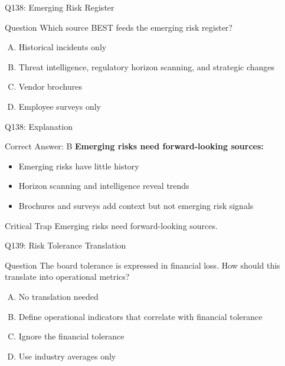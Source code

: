 \documentclass{beamer}
\begin{document}
	\begin{frame}{Q138: Emerging Risk Register}
		\begin{block}{Question}
			Which source BEST feeds the emerging risk register?
		\end{block}
		\begin{enumerate}[(A)]
			\item Historical incidents only
			\item Threat intelligence, regulatory horizon scanning, and strategic changes
			\item Vendor brochures
			\item Employee surveys only
		\end{enumerate}
	\end{frame}
	
	\begin{frame}{Q138: Explanation}
		\begin{block}{Correct Answer: B}
			\textbf{Emerging risks need forward-looking sources:}
			\begin{itemize}
				\item Emerging risks have little history
				\item Horizon scanning and intelligence reveal trends
				\item Brochures and surveys add context but not emerging risk signals
			\end{itemize}
		\end{block}
		\begin{alertblock}{Critical Trap}
			Emerging risks need forward-looking sources.
		\end{alertblock}
	\end{frame}
	
	\begin{frame}{Q139: Risk Tolerance Translation}
		\begin{block}{Question}
			The board tolerance is expressed in financial loss. How should this translate into operational metrics?
		\end{block}
		\begin{enumerate}[(A)]
			\item No translation needed
			\item Define operational indicators that correlate with financial tolerance
			\item Ignore the financial tolerance
			\item Use industry averages only
		\end{enumerate}
	\end{frame}
	
\end{document}
